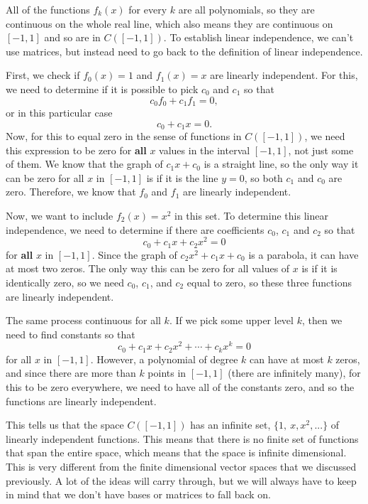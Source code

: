 \begin{exampleSol}
All of the functions $f_k(x)$ for every $k$ are all polynomials, so they are continuous on the whole real line, which also means they are continuous on $[-1,1]$ and so are in $C([-1,1])$. To establish linear independence, we can't use matrices, but instead need to go back to the definition of linear independence. 

First, we check if $f_0(x) = 1$ and $f_1(x) = x$ are linearly independent. For this, we need to determine if it is possible to pick $c_0$ and $c_1$ so that
\[ c_0f_0 + c_1f_1 = 0, \] or in this particular case 
\[ c_0 + c_1 x = 0. \] Now, for this to equal zero in the sense of functions in $C([-1,1])$, we need this expression to be zero for \textbf{all} $x$ values in the interval $[-1,1]$, not just some of them. We know that the graph of $c_1 x + c_0$ is a straight line, so the only way it can be zero for all $x$ in $[-1,1]$ is if it is the line $y=0$, so both $c_1$ and $c_0$ are zero. Therefore, we know that $f_0$ and $f_1$ are linearly independent. 

Now, we want to include $f_2(x) = x^2$ in this set. To determine this linear independence, we need to determine if there are coefficients $c_0$, $c_1$ and $c_2$ so that
\[ c_0 + c_1 x + c_2x^2 = 0 \] for \textbf{all} $x$ in $[-1,1]$. Since the graph of $c_2x^2 + c_1x + c_0$ is a parabola, it can have at most two zeros. The only way this can be zero for all values of $x$ is if it is identically zero, so we need $c_0$, $c_1$, and $c_2$ equal to zero, so these three functions are linearly independent. 

The same process continuous for all $k$. If we pick some upper level $k$, then we need to find constants so that 
\[ c_0 + c_1x + c_2x^2 + \cdots + c_kx^k = 0\] for all $x$ in $[-1,1]$. However, a polynomial of degree $k$ can have at most $k$ zeros, and since there are more than $k$ points in $[-1,1]$ (there are infinitely many), for this to be zero everywhere, we need to have all of the constants zero, and so the functions are linearly independent.    
\end{exampleSol}

This tells us that the space $C([-1,1])$ has an infinite set, $\{1,\ x, x^2, ... \}$ of linearly independent functions. This means that there is no finite set of functions that span the entire space, which means that the space is infinite dimensional. This is very different from the finite dimensional vector spaces that we discussed previously. A lot of the ideas will carry through, but we will always have to keep in mind that we don't have bases or matrices to fall back on. 

